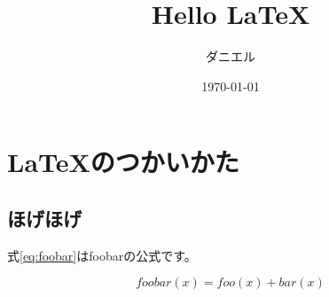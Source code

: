 \documentclass[a4paper,11pt,xelatex,ja=standard]{bxjsarticle}
\title{Hello \LaTeX}
\author{ダニエル}
\date{\today}
\begin{document}
\maketitle

\section{\LaTeX のつかいかた}
\subsection{ほげほげ}
式\ref{eq:foobar}はfoobarの公式です。

\begin{equation}
    \label{eq:foobar}
    foobar(x) = foo(x) + bar(x)
\end{equation}
\end{document}
